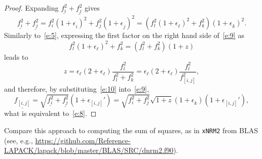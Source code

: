 \documentclass[a4paper,12pt,twoside]{article}
\begin{document}
\begin{proof}
  Expanding $\underline{f_i^2}+\underline{f_j^2}$ gives
  \begin{equation}
    \underline{f_i^2}+\underline{f_j^2}=f_i^2(1+\epsilon_i^{})^2+f_j^2(1+\epsilon_j^{})^2=(f_l^2(1+\epsilon_{\ell}^{})^2+f_k^2)(1+\epsilon_k^{})^2.
    \label{e:9}
  \end{equation}
  Similarly to~\eqref{e:5}, expressing the first factor on the right hand
  side of~\eqref{e:9} as
  \begin{equation}
    f_l^2(1+\epsilon_{\ell}^{})^2+f_k^2=(f_l^2+f_k^2)(1+z)
    \label{e:10}
  \end{equation}
  leads to
  \begin{displaymath}
    z=\epsilon_{\ell}(2+\epsilon_{\ell})\frac{f_l^2}{f_l^2+f_k^2}=\epsilon_{\ell}(2+\epsilon_{\ell})\frac{f_l^2}{f_{[i,j]}^2},
  \end{displaymath}
  and therefore, by substituting~\eqref{e:10} into~\eqref{e:9},
  \begin{displaymath}
    \underline{f_{[i,j]}^{}}=\sqrt{\underline{f_i^2}+\underline{f_j^2}}(1+\epsilon_{[i,j]}')=\sqrt{f_i^2+f_j^2}\sqrt{1+z}(1+\epsilon_k^{})(1+\epsilon_{[i,j]}'),
  \end{displaymath}
  what is equivalent to~\eqref{e:8}.
\end{proof}

Compare this approach to computing the sum of squares, as in
\texttt{xNRM2} from BLAS (see, e.g.,
\url{https://github.com/Reference-LAPACK/lapack/blob/master/BLAS/SRC/dnrm2.f90}).
\end{document}
